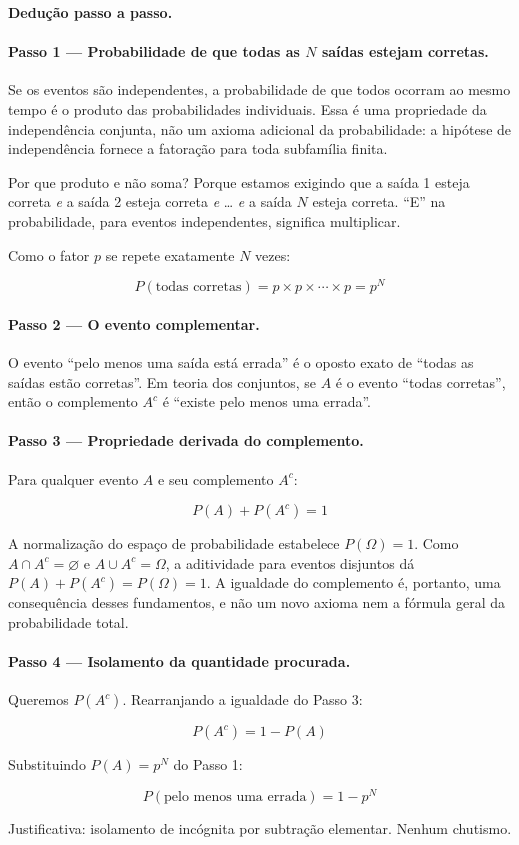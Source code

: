 \begin{metodo}
\textbf{Dedução passo a passo.}

\paragraph{Passo 1 — Probabilidade de que todas as $N$ saídas estejam corretas.}
Se os eventos são independentes, a probabilidade de que todos ocorram ao mesmo tempo é o produto das probabilidades individuais. Essa é uma propriedade da independência conjunta, não um axioma adicional da probabilidade: a hipótese de independência fornece a fatoração para toda subfamília finita.

Por que produto e não soma? Porque estamos exigindo que a saída 1 esteja correta \emph{e} a saída 2 esteja correta \emph{e} … \emph{e} a saída $N$ esteja correta. “E” na probabilidade, para eventos independentes, significa multiplicar.

Como o fator $p$ se repete exatamente $N$ vezes:

\[
P(\text{todas corretas}) = p \times p \times \cdots \times p = p^N
\]

\paragraph{Passo 2 — O evento complementar.}
O evento “pelo menos uma saída está errada” é o oposto exato de “todas as saídas estão corretas”. Em teoria dos conjuntos, se $A$ é o evento “todas corretas”, então o complemento $A^c$ é “existe pelo menos uma errada”.

\paragraph{Passo 3 — Propriedade derivada do complemento.}
Para qualquer evento $A$ e seu complemento $A^c$:

\[
P(A) + P(A^c) = 1
\]

A normalização do espaço de probabilidade estabelece $P(\Omega)=1$. Como $A\cap A^c=\varnothing$ e $A\cup A^c=\Omega$, a aditividade para eventos disjuntos dá $P(A)+P(A^c)=P(\Omega)=1$. A igualdade do complemento é, portanto, uma consequência desses fundamentos, e não um novo axioma nem a fórmula geral da probabilidade total.

\paragraph{Passo 4 — Isolamento da quantidade procurada.}
Queremos $P(A^c)$. Rearranjando a igualdade do Passo 3:

\[
P(A^c) = 1 - P(A)
\]

Substituindo $P(A) = p^N$ do Passo 1:

\[
\boxed{P(\text{pelo menos uma errada}) = 1 - p^N}
\]

Justificativa: isolamento de incógnita por subtração elementar. Nenhum chutismo.
\end{metodo}

